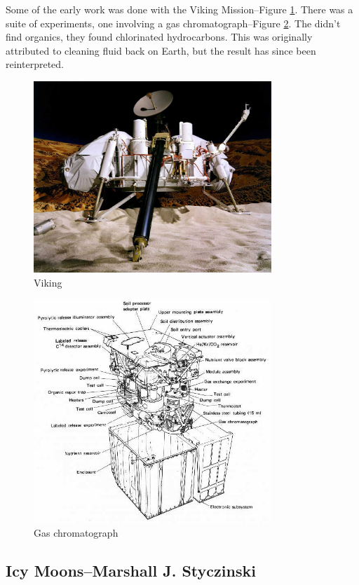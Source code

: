 \documentclass[]{article}
\begin{document}
Some of the early work was done with the Viking Mission--Figure \ref{fig:mars:5}. There was a suite of experiments, one involving a gas chromatograph--Figure \ref{fig:mars:6}. The didn't find organics, they found chlorinated hydrocarbons. This was originally attributed to cleaning fluid back on Earth, but the result has since been reinterpreted.
\begin{figure}[H]
	\caption{Viking}\label{fig:mars:5}
	\includegraphics[width=0.8\textwidth]{Mars5}
\end{figure}

\begin{figure}[H]
	\caption{Gas chromatograph}\label{fig:mars:6}
	\includegraphics[width=0.8\textwidth]{Mars6}
\end{figure}

\subsection[Icy Moons]{Icy Moons--Marshall J. Styczinski}
\end{document}
